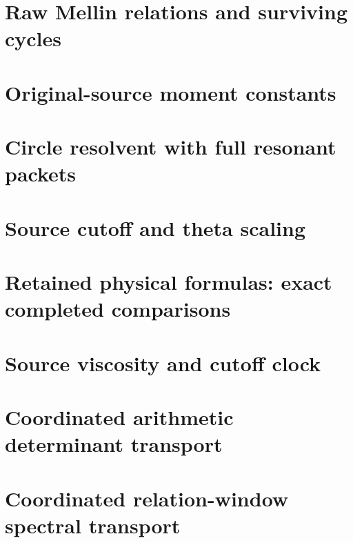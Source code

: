 \documentclass[11pt,a4paper,oneside]{report}
\begin{document}
\chapter{Raw Mellin relations and surviving cycles}
\begingroup

\endgroup
\clearpage
\chapter{Original-source moment constants}
\begingroup

\endgroup
\clearpage
\chapter{Circle resolvent with full resonant packets}
\begingroup

\endgroup
\clearpage
\chapter{Source cutoff and theta scaling}
\begingroup

\endgroup
\clearpage
\chapter{Retained physical formulas: exact completed comparisons}
\begingroup

\endgroup
\clearpage
\chapter{Source viscosity and cutoff clock}
\begingroup

\endgroup
\clearpage
\chapter{Coordinated arithmetic determinant transport}
\begingroup

\endgroup
\clearpage
\chapter{Coordinated relation-window spectral transport}
\begingroup

\endgroup
\clearpage
\end{document}
